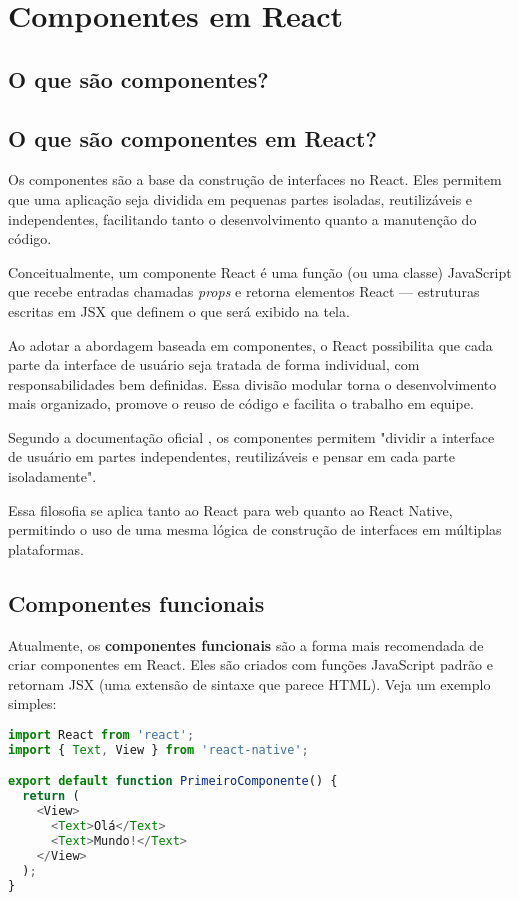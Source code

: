 \chapter{Componentes em React}

\section{O que são componentes?}

\section{O que são componentes em React?}

Os componentes são a base da construção de interfaces no React. Eles permitem que uma aplicação seja dividida em pequenas partes isoladas, reutilizáveis e independentes, facilitando tanto o desenvolvimento quanto a manutenção do código.

Conceitualmente, um componente React é uma função (ou uma classe) JavaScript que recebe entradas chamadas \textit{props} e retorna elementos React — estruturas escritas em JSX que definem o que será exibido na tela.

Ao adotar a abordagem baseada em componentes, o React possibilita que cada parte da interface de usuário seja tratada de forma individual, com responsabilidades bem definidas. Essa divisão modular torna o desenvolvimento mais organizado, promove o reuso de código e facilita o trabalho em equipe.

Segundo a documentação oficial \cite{reactDocsComponents}, os componentes permitem "dividir a interface de usuário em partes independentes, reutilizáveis e pensar em cada parte isoladamente".

Essa filosofia se aplica tanto ao React para web quanto ao React Native, permitindo o uso de uma mesma lógica de construção de interfaces em múltiplas plataformas.


\section{Componentes funcionais}

Atualmente, os \textbf{componentes funcionais} são a forma mais recomendada de criar componentes em React. Eles são criados com funções JavaScript padrão e retornam JSX (uma extensão de sintaxe que parece HTML). Veja um exemplo simples:

\begin{lstlisting}[language=JavaScript, caption={Componente funcional PrimeiroComponente.js}]
import React from 'react';
import { Text, View } from 'react-native';

export default function PrimeiroComponente() {
  return (
    <View>
      <Text>Olá</Text>
      <Text>Mundo!</Text>
    </View>
  );
}
\end{lstlisting}

